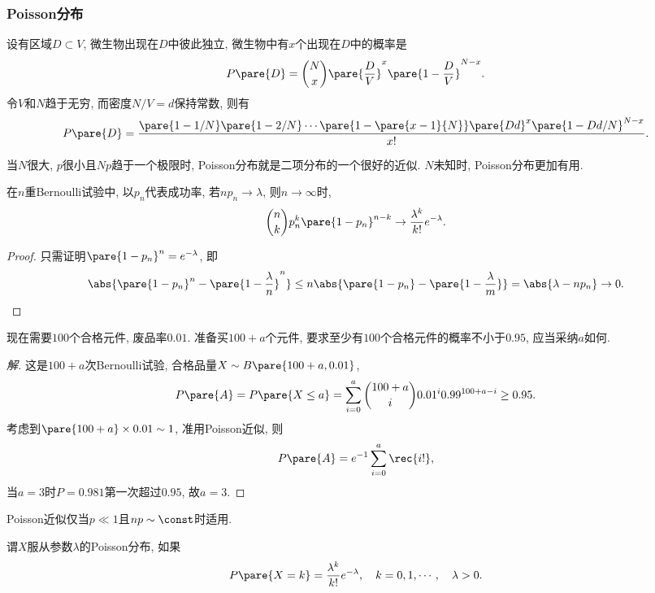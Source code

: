 \documentclass{ctexart}
\begin{document}
\subsubsection{Poisson分布} %
\label{ssub:poisson分布}

\begin{ex}
    设有区域$D\subset V$, 微生物出现在$D$中彼此独立, 微生物中有$x$个出现在$D$中的概率是
    \[ P\pare{D} = \binom{N}{x}\pare{\frac{D}{V}}^x\pare{1-\frac{D}{V}}^{N-x}. \]
    令$V$和$N$趋于无穷, 而密度$N/V=d$保持常数, 则有
    \[ P\pare{D} = \frac{\pare{1-1/N}\pare{1-2/N}\cdots\pare{1-\pare{x-1}{N}}\pare{Dd}^x\pare{1-Dd/N}^{N-x}}{x!}. \]
\end{ex}
当$N$很大, $p$很小且$Np$趋于一个极限时, Poisson分布就是二项分布的一个很好的近似. $N$未知时, Poisson分布更加有用.
\begin{theorem}
    在$n$重Bernoulli试验中, 以$p_n$代表成功率, 若$np_n\rightarrow \lambda$, 则$n\rightarrow \infty$时,
    \[ \binom{n}{k}p_n^k\pare{1-p_n}^{n-k} \rightarrow \frac{\lambda^k}{k!}e^{-\lambda}. \]
\end{theorem}
\begin{proof}
    只需证明$\pare{1-p_n}^n = e^{-\lambda}$, 即
    \[ \abs{\pare{1-p_n}^n - \pare{1-\frac{\lambda}{n}}^n} \le n\abs{\pare{1-p_n} - \pare{1-\frac{\lambda}{m}}} = \abs{\lambda - np_n}\rightarrow 0. \qedhere \]
\end{proof}
\begin{sample}
    \begin{ex}
        现在需要$100$个合格元件, 废品率$0.01$. 准备买$100+a$个元件, 要求至少有$100$个合格元件的概率不小于$0.95$, 应当采纳$a$如何.
    \end{ex}
    \begin{proof}[解]
        这是$100+a$次Bernoulli试验, 合格品量$X\sim B\pare{100+a,0.01}$,
        \[ P\pare{A} = P\pare{X\le a} = \sum_{i=0}^a \binom{100+a}{i}0.01^i0.99^{100+a-i} \ge 0.95. \]
        考虑到$\pare{100+a}\times 0.01\sim 1$, 准用Poisson近似, 则
        \[ P\pare{A} = e^{-1} \sum_{i=0}^a \rec{i!}, \]
        当$a=3$时$P=0.981$第一次超过$0.95$, 故$a=3$.
    \end{proof}
\end{sample}
\begin{pitfall}
    Poisson近似仅当$p\ll 1$且$np\sim \const$时适用.
\end{pitfall}
谓$X$服从参数$\lambda$的Poisson分布, 如果
\[ P\pare{X=k} = \frac{\lambda^k}{k!}e^{-\lambda},\quad k = 0,1,\cdots,\quad \lambda > 0. \]
\end{document}
